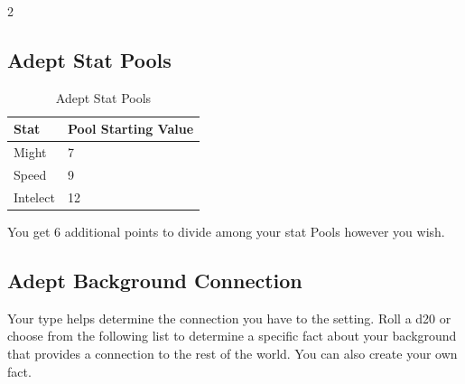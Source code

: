 \begin{multicols}{2}
\subsection{Adept Stat Pools}

\begin{table}[H]
\centering
\caption{Adept Stat Pools}
\label{tab: Adept Stat Pools}

\begin{tabularx}{\linewidth}{| X | X |}
\hline
\textbf{Stat} & \textbf{Pool Starting Value} \\
\hline
Might & 7 \\ \hline
Speed & 9 \\ \hline
Intelect & 12  \\ \hline

\end{tabularx}

\end{table}

\raggedright

You get 6 additional points to divide among your stat Pools however you wish.

\subsection{Adept Background Connection}

Your type helps determine the connection you have to the setting. Roll a d20 or choose from the following list to determine a specific fact about your background that provides a connection to the rest of the world. You can also create your own fact.

\begin{table}
\centering

\caption{Adept Background Connection}
\label{tab:Adept Background Connection}


\end{table}
\end{multicols}
